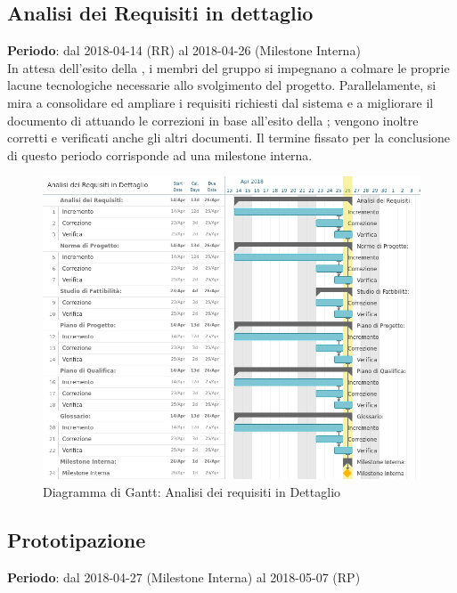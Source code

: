 \subsection{Analisi dei Requisiti in dettaglio}
\textbf{Periodo}: dal 2018-04-14 (RR) al 2018-04-26 (Milestone Interna)\\

In attesa dell'esito della \RR{}, i membri del gruppo si impegnano a colmare le proprie lacune tecnologiche necessarie allo svolgimento del progetto. Parallelamente, si mira a consolidare ed ampliare i requisiti richiesti dal sistema e a migliorare il documento di \AdR{} attuando le correzioni in base all’esito della \RR{}; vengono inoltre corretti e verificati anche gli altri documenti. Il termine fissato per la conclusione di questo periodo corrisponde ad una milestone interna.

\begin{figure}[h!]
	\centerline{\includegraphics[scale=0.55]{img/DiagrammiGantt/AnalisiRequisitiDettaglio.jpg}}
	\caption{Diagramma di Gantt: Analisi dei requisiti in Dettaglio}
	\label{fig:gantt_ana_req_dett}
\end{figure}
\clearpage

\subsection{Prototipazione}
\textbf{Periodo}: dal 2018-04-27 (Milestone Interna) al 2018-05-07 (RP)\\

